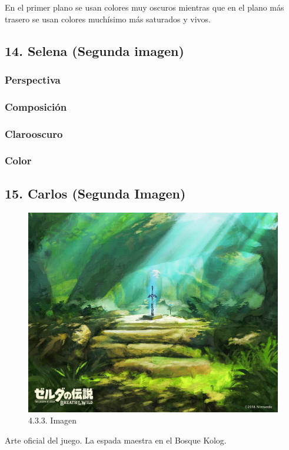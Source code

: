 \documentclass[12pt]{article}
\begin{document}
        En el primer plano se usan colores muy oscuros mientras que en el plano más trasero se usan colores muchísimo más saturados y vivos. 

\newpage


    \subsection{14. Selena (Segunda imagen)}
        \subsubsection{Perspectiva}

        \subsubsection{Composición}

        \subsubsection{Clarooscuro}

        \subsubsection{Color}
        \newpage


    \subsection{15. Carlos (Segunda Imagen)}
      \begin{figure}[H]
      \centering
      \includegraphics[scale=0.7]{images/Concepts/15_concept_art.jpg}
      \caption{\small 4.3.3. Imagen}
      \end{figure}
      Arte oficial del juego. La espada maestra en el Bosque Kolog.
\end{document}
